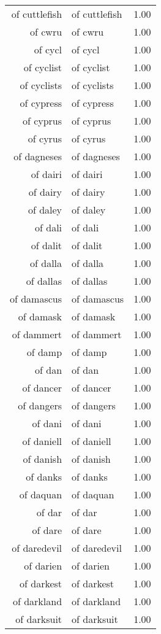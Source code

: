 \begin{table}[ht]
\begin{tabular}{rlr}
  of cuttlefish & of cuttlefish & 1.00 \\ 
  of cwru & of cwru & 1.00 \\ 
  of cycl & of cycl & 1.00 \\ 
  of cyclist & of cyclist & 1.00 \\ 
  of cyclists & of cyclists & 1.00 \\ 
  of cypress & of cypress & 1.00 \\ 
  of cyprus & of cyprus & 1.00 \\ 
  of cyrus & of cyrus & 1.00 \\ 
  of dagneses & of dagneses & 1.00 \\ 
  of dairi & of dairi & 1.00 \\ 
  of dairy & of dairy & 1.00 \\ 
  of daley & of daley & 1.00 \\ 
  of dali & of dali & 1.00 \\ 
  of dalit & of dalit & 1.00 \\ 
  of dalla & of dalla & 1.00 \\ 
  of dallas & of dallas & 1.00 \\ 
  of damascus & of damascus & 1.00 \\ 
  of damask & of damask & 1.00 \\ 
  of dammert & of dammert & 1.00 \\ 
  of damp & of damp & 1.00 \\ 
  of dan & of dan & 1.00 \\ 
  of dancer & of dancer & 1.00 \\ 
  of dangers & of dangers & 1.00 \\ 
  of dani & of dani & 1.00 \\ 
  of daniell & of daniell & 1.00 \\ 
  of danish & of danish & 1.00 \\ 
  of danks & of danks & 1.00 \\ 
  of daquan & of daquan & 1.00 \\ 
  of dar & of dar & 1.00 \\ 
  of dare & of dare & 1.00 \\ 
  of daredevil & of daredevil & 1.00 \\ 
  of darien & of darien & 1.00 \\ 
  of darkest & of darkest & 1.00 \\ 
  of darkland & of darkland & 1.00 \\ 
  of darksuit & of darksuit & 1.00 \\ 

\end{tabular}
\end{table}
